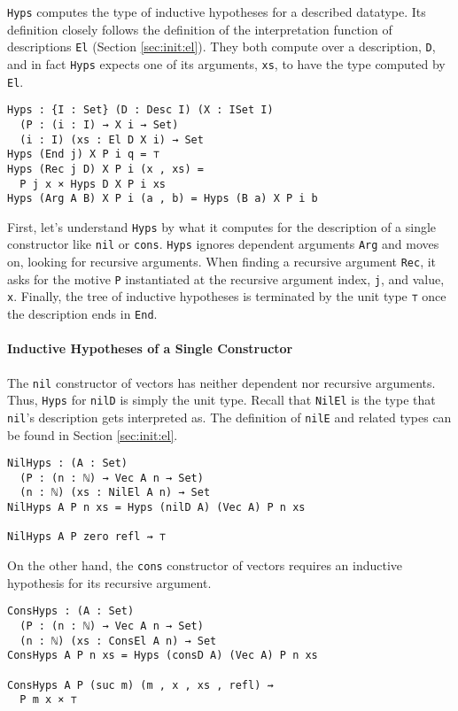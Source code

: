 \documentclass[preprint,nonatbib]{sigplanconf}
\newcommand{\refsec}[1]{Section \ref{sec:#1}}
\begin{document}
{\tt Hyps} computes the type of inductive hypotheses for a described
datatype. Its definition closely follows the definition of
the interpretation function of descriptions {\tt El}
(\refsec{init:el}). They both compute over a description, {\tt D}, and in
fact {\tt Hyps} expects one of its arguments, {\tt xs}, to have the type
computed by {\tt El}.

\begin{verbatim}
Hyps : {I : Set} (D : Desc I) (X : ISet I)
  (P : (i : I) → X i → Set)
  (i : I) (xs : El D X i) → Set
Hyps (End j) X P i q = ⊤
Hyps (Rec j D) X P i (x , xs) =
  P j x × Hyps D X P i xs
Hyps (Arg A B) X P i (a , b) = Hyps (B a) X P i b
\end{verbatim}

First, let's understand {\tt Hyps} by what it computes for the
description of a single constructor like {\tt nil} or {\tt cons}.
{\tt Hyps} ignores dependent arguments {\tt Arg} and moves on, looking
for recursive arguments. When finding a recursive argument {\tt Rec}, it
asks for the motive {\tt P} instantiated at the recursive argument index, {\tt j}, and value, {\tt x}.
Finally, the tree of inductive hypotheses is terminated by the unit
type {\tt ⊤} once the description ends in {\tt End}.

\paragraph{Inductive Hypotheses of a Single Constructor}

The {\tt nil} constructor of vectors has neither dependent nor
recursive arguments. Thus, {\tt Hyps} for {\tt nilD} is simply
the unit type. Recall that {\tt NilEl} is the type that
{\tt nil}'s description gets interpreted as. The definition of
{\tt nilE} and related types can be found in \refsec{init:el}.

\begin{verbatim}
NilHyps : (A : Set)
  (P : (n : ℕ) → Vec A n → Set)
  (n : ℕ) (xs : NilEl A n) → Set
NilHyps A P n xs = Hyps (nilD A) (Vec A) P n xs

NilHyps A P zero refl ⇝ ⊤
\end{verbatim}

On the other hand, the {\tt cons} constructor of vectors requires an
inductive hypothesis for its recursive argument.

\begin{verbatim}
ConsHyps : (A : Set)
  (P : (n : ℕ) → Vec A n → Set)
  (n : ℕ) (xs : ConsEl A n) → Set
ConsHyps A P n xs = Hyps (consD A) (Vec A) P n xs

ConsHyps A P (suc m) (m , x , xs , refl) ⇝
  P m x × ⊤
\end{verbatim}
\end{document}
